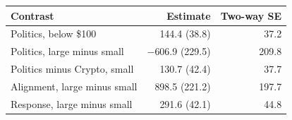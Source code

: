 \begin{tabular}{lrr}
\toprule
Contrast & Estimate & Two-way SE \\
\midrule
Politics, below \$100 & 144.4 (38.8) & 37.2 \\
Politics, large minus small & \ensuremath{-}606.9 (229.5) & 209.8 \\
Politics minus Crypto, small & 130.7 (42.4) & 37.7 \\
\addlinespace
Alignment, large minus small & 898.5 (221.2) & 197.7 \\
Response, large minus small & 291.6 (42.1) & 44.8 \\
\bottomrule
\end{tabular}
